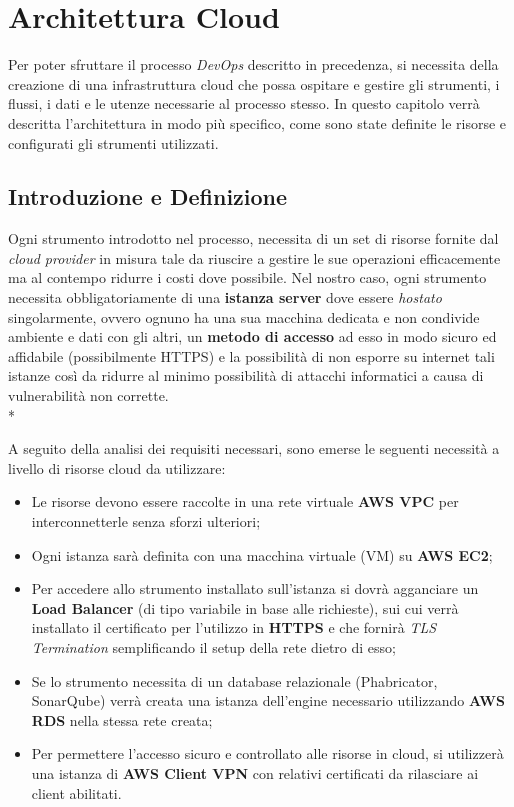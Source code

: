 \documentclass[../main.tex]{subfiles}
\begin{document}
    \chapter{Architettura Cloud}
    
        Per poter sfruttare il processo \emph{DevOps} descritto in precedenza, si necessita della creazione di una infrastruttura cloud che possa ospitare e gestire gli strumenti, i flussi, i dati e le utenze necessarie al processo stesso. In questo capitolo verrà descritta l'architettura in modo più specifico, come sono state definite le risorse e configurati gli strumenti utilizzati.
	
	    \section{Introduzione e Definizione}
	    
	        Ogni strumento introdotto nel processo, necessita di un set di risorse fornite dal \emph{cloud provider} in misura tale da riuscire a gestire le sue operazioni efficacemente ma al contempo ridurre i costi dove possibile. Nel nostro caso, ogni strumento necessita obbligatoriamente di una \textbf{istanza server} dove essere \emph{hostato} singolarmente, ovvero ognuno ha una sua macchina dedicata e non condivide ambiente e dati con gli altri, un \textbf{metodo di accesso} ad esso in modo sicuro ed affidabile (possibilmente HTTPS) e la possibilità di non esporre su internet tali istanze così da ridurre al minimo possibilità di attacchi informatici a causa di vulnerabilità non corrette.\\*
	        
	        A seguito della analisi dei requisiti necessari, sono emerse le seguenti necessità a livello di risorse cloud da utilizzare:
	        \begin{itemize}
	            \item Le risorse devono essere raccolte in una rete virtuale \textbf{AWS VPC} per interconnetterle senza sforzi ulteriori;
	            \item Ogni istanza sarà definita con una macchina virtuale (VM) su \textbf{AWS EC2};
	            \item Per accedere allo strumento installato sull'istanza si dovrà agganciare un \textbf{Load Balancer} (di tipo variabile in base alle richieste), sui cui verrà installato il certificato per l'utilizzo in \textbf{HTTPS} e che fornirà \emph{TLS Termination} semplificando il setup della rete dietro di esso;
	            \item Se lo strumento necessita di un database relazionale (Phabricator, SonarQube) verrà creata una istanza dell'engine necessario utilizzando \textbf{AWS RDS} nella stessa rete creata;
	            \item Per permettere l'accesso sicuro e controllato alle risorse in cloud, si utilizzerà una istanza di \textbf{AWS Client VPN} con relativi certificati da rilasciare ai client abilitati.
	        \end{itemize}
	
\end{document}
